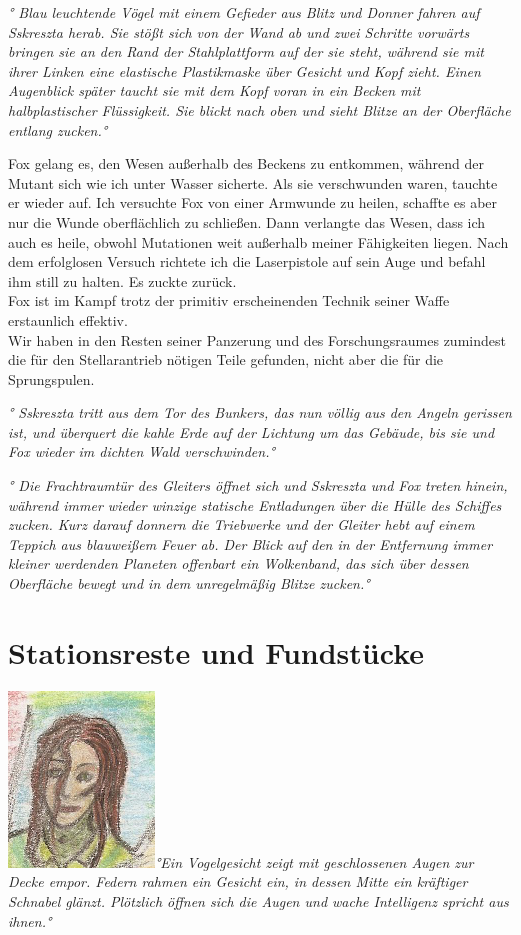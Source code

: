 \documentclass[11pt]{scrartcl}
\begin{document}
\emph{° Blau leuchtende Vögel mit einem Gefieder aus Blitz und Donner
fahren auf Sskreszta herab. Sie stößt sich von der Wand ab und zwei
Schritte vorwärts bringen sie an den Rand der Stahlplattform auf der sie
steht, während sie mit ihrer Linken eine elastische Plastikmaske über
Gesicht und Kopf zieht. Einen Augenblick später taucht sie mit dem Kopf
voran in ein Becken mit halbplastischer Flüssigkeit. Sie blickt nach
oben und sieht Blitze an der Oberfläche entlang zucken.°}

Fox gelang es, den Wesen außerhalb des Beckens zu entkommen, während der
Mutant sich wie ich unter Wasser sicherte. Als sie verschwunden waren,
tauchte er wieder auf. Ich versuchte Fox von einer Armwunde zu heilen,
schaffte es aber nur die Wunde oberflächlich zu schließen. Dann
verlangte das Wesen, dass ich auch es heile, obwohl Mutationen weit
außerhalb meiner Fähigkeiten liegen. Nach dem erfolglosen Versuch
richtete ich die Laserpistole auf sein Auge und befahl ihm still zu
halten. Es zuckte zurück.\\ Fox ist im Kampf trotz der primitiv
erscheinenden Technik seiner Waffe erstaunlich effektiv.\\ Wir haben in
den Resten seiner Panzerung und des Forschungsraumes zumindest die für
den Stellarantrieb nötigen Teile gefunden, nicht aber die für die
Sprungspulen.

\emph{° Sskreszta tritt aus dem Tor des Bunkers, das nun völlig aus den
Angeln gerissen ist, und überquert die kahle Erde auf der Lichtung um
das Gebäude, bis sie und Fox wieder im dichten Wald verschwinden.°}

\emph{° Die Frachtraumtür des Gleiters öffnet sich und Sskreszta und Fox
treten hinein, während immer wieder winzige statische Entladungen über
die Hülle des Schiffes zucken. Kurz darauf donnern die Triebwerke und
der Gleiter hebt auf einem Teppich aus blauweißem Feuer ab. Der Blick
auf den in der Entfernung immer kleiner werdenden Planeten offenbart ein
Wolkenband, das sich über dessen Oberfläche bewegt und in dem
unregelmäßig Blitze zucken.°}

\section{Stationsreste und Fundstücke}

\includegraphics{sskreszta-portrait-alt-klein.png}\emph{°Ein
Vogelgesicht zeigt mit geschlossenen Augen zur Decke empor. Federn
rahmen ein Gesicht ein, in dessen Mitte ein kräftiger Schnabel glänzt.
Plötzlich öffnen sich die Augen und wache Intelligenz spricht aus
ihnen.°}
\end{document}
